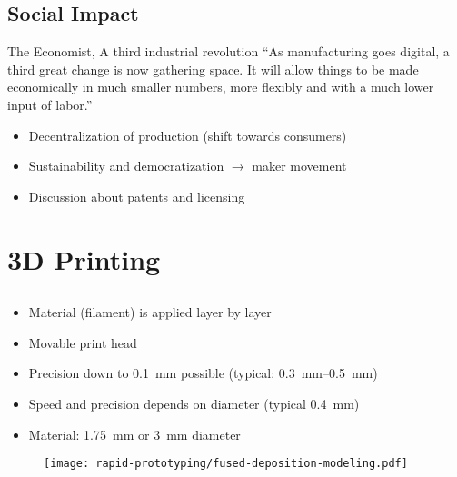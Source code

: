 \documentclass[aspectratio=169]{beamer}
\begin{document}
\subsection{Social Impact}
\begin{frame}
    \begin{block}{The Economist, A third industrial revolution}
        ``As manufacturing goes digital, a third great change is now gathering space.
        It will allow things to be made economically in much smaller numbers, more flexibly and with a much lower input of labor.''
    \end{block}
    \begin{itemize}
        \item Decentralization of production (shift towards consumers)
        \item Sustainability and democratization $\rightarrow$ maker movement
        \item Discussion about patents and licensing
    \end{itemize}
\end{frame}

\section{3D Printing}
\subsection{}
\begin{frame}
    \begin{itemize}
        \item Material (filament) is applied layer by layer
        \item Movable print head
        \item Precision down to \SI{0.1}{\milli\meter} possible (typical: \SIrange{0.3}{0.5}{\milli\meter})
        \item Speed and precision depends on diameter (typical \SI{0.4}{\milli\meter})
        \item Material: \SI{1.75}{\milli\meter} or \SI{3}{\milli\meter} diameter
    \end{itemize}
\end{frame}

\begin{frame}
    \begin{figure}
        \texttt{[image: rapid-prototyping/fused-deposition-modeling.pdf]}
        \caption{}
    \end{figure}
\end{frame}
\end{document}
